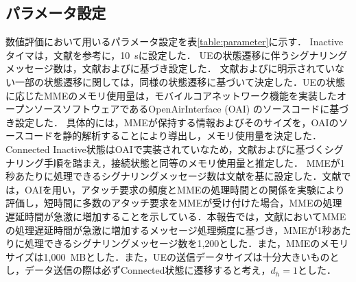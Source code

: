 \documentclass[technicalreport]{ieicej-rev}
\begin{document}
\subsection{パラメータ設定}
\label{sec:パラメータ設定}
数値評価において用いるパラメータ設定を表\ref{table:parameter}に示す．
Inactive タイマは，文献\cite{ANovelStateModelfor5GRadioAccessNetworks}を参考に，10~sに設定した．
UEの状態遷移に伴うシグナリングメッセージ数は，文献\cite{3gpp.23.720}および\cite{ANovelStateModelfor5GRadioAccessNetworks}に基づき設定した．
文献\cite{3gpp.23.720}および\cite{ANovelStateModelfor5GRadioAccessNetworks}に明示されていない一部の状態遷移に関しては，同様の状態遷移に基づいて決定した．UEの状態に応じたMMEのメモリ使用量は，モバイルコアネットワーク機能を実装したオープンソースソフトウェアであるOpenAirInterface (OAI) \cite{OpenAirInterface}のソースコードに基づき設定した．
具体的には，MMEが保持する情報およびそのサイズを，OAIのソースコードを静的解析することにより導出し，メモリ使用量を決定した．
Connected Inactive状態はOAIで実装されていなため，文献\cite{3gpp.23.720}および\cite{ANovelStateModelfor5GRadioAccessNetworks}に基づくシグナリング手順を踏まえ，接続状態と同等のメモリ使用量と推定した．
MMEが1秒あたりに処理できるシグナリングメッセージ数は文献\cite{多数のM2M/IoT端末からの集中アクセスを考慮したモバイルコアネットワークの実験評価}を基に設定した．文献\cite{多数のM2M/IoT端末からの集中アクセスを考慮したモバイルコアネットワークの実験評価}では，OAIを用い，アタッチ要求の頻度とMMEの処理時間との関係を実験により評価し，短時間に多数のアタッチ要求をMMEが受け付けた場合，MMEの処理遅延時間が急激に増加することを示している．本報告では，文献\cite{多数のM2M/IoT端末からの集中アクセスを考慮したモバイルコアネットワークの実験評価}においてMMEの処理遅延時間が急激に増加するメッセージ処理頻度に基づき，MMEが1秒あたりに処理できるシグナリングメッセージ数を1,200とした．また，MMEのメモリサイズは1,000~MBとした．また，UEの送信データサイズは十分大きいものとし，データ送信の際は必ずConnected状態に遷移すると考え，$d_h = 1$とした．
\end{document}
